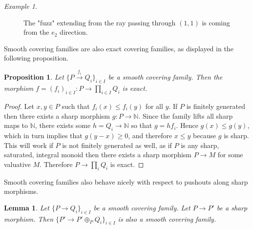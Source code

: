 \documentclass[12pt]{amsart}
\numberwithin{equation}{section}
\theoremstyle{plain}
\newtheorem{prop}[equation]{Proposition}
\newtheorem{lem}[equation]{Lemma}
\theoremstyle{remark}
\newtheorem{exm}[equation]{Example}
\newcommand{\NN}{\mathbb N}
\begin{document}
\begin{exm}
\begin{figure}[h!]\label{FuzzyCone}
	\begin{center}
		\caption{The "fuzz" extending from the ray passing through $(1,1)$ is coming from the $e_2$ direction.}
	\end{center}
\end{figure}
\end{exm}
\newpage

Smooth covering families are also exact covering families, as displayed in the following proposition.
\begin{prop}\label{smoothExactness}
	Let $\{P\xrightarrow{f_i} Q_i\}_{i\in I}$ be a smooth covering family. Then the morphism $f = (f_i)_{i\in I}:P\to\prod_{i\in I} Q_i$ is exact.
\end{prop}
\begin{proof}
Let $x,y\in P$ such that $f_i(x)\leq f_i(y)$ for all $y$. If $P$ is finitely generated then there exists a sharp morphism $g:P\to \NN$. Since the family lifts all sharp maps to $\NN$, there exists some $h = Q_i\to \NN$ so that $g = hf_i$. Hence $g(x)\leq g(y)$, which in turn implies that $g(y-x)\geq 0$, and therefore $x\leq y$ because $g$ is sharp. This will work if $P$ is not finitely generated as well, as if $P$ is any sharp, saturated, integral monoid then there exists a sharp morphism $P\to M$ for some valuative $M$. Therefore $P\to \prod_i Q_i$ is exact. 
\end{proof}
Smooth covering families also behave nicely with respect to pushouts along sharp morphisms.
\begin{lem}\label{smoothSharpPushouts}
	Let $\{P\to Q_i\}_{i\in I}$ be a smooth covering family. Let $P\to P'$ be a sharp morphism. Then $\{P'\to P'\oplus_P Q_i\}_{i\in I}$ is also a smooth covering family. 
\end{lem}
\end{document}
